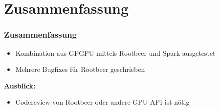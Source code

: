 \section{Zusammenfassung}
\begin{frame}
	\frametitle{Zusammenfassung}
	\begin{itemize}
		\item Kombination aus GPGPU mittels Rootbeer und Spark ausgetestet
        \item Mehrere Bugfixes für Rootbeer geschrieben
	\end{itemize}
    \textbf{Ausblick:}
    \begin{itemize}
        \item Codereview von Rootbeer oder andere GPU-API ist nötig

\end{itemize}
\end{frame}
